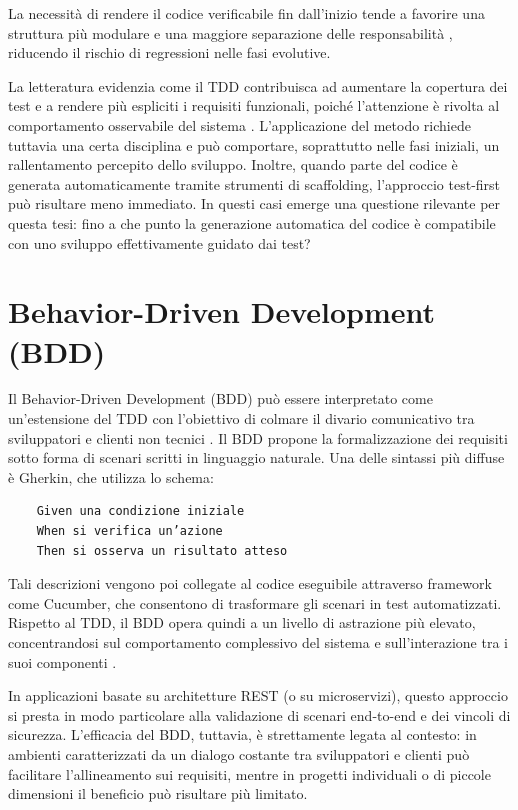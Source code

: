 La necessità di rendere il codice verificabile fin dall’inizio tende a favorire una struttura più modulare e una maggiore separazione delle responsabilità \cite{Meszaros2007}, riducendo il rischio di regressioni nelle fasi evolutive.

La letteratura evidenzia come il TDD contribuisca ad aumentare la copertura dei test e a rendere più espliciti i requisiti funzionali, poiché l’attenzione è rivolta al comportamento osservabile del sistema \cite{FarcicGarcia2015}. L’applicazione del metodo richiede tuttavia una certa disciplina e può comportare, soprattutto nelle fasi iniziali, un rallentamento percepito dello sviluppo. Inoltre, quando parte del codice è generata automaticamente tramite strumenti di scaffolding, l’approccio test-first può risultare meno immediato. In questi casi emerge una questione rilevante per questa tesi: fino a che punto la generazione automatica del codice è compatibile con uno sviluppo effettivamente guidato dai test?

\section{Behavior-Driven Development (BDD)}

Il Behavior-Driven Development (BDD) può essere interpretato come un’estensione del TDD con l’obiettivo di colmare il divario comunicativo tra sviluppatori e clienti non tecnici \cite{North2006}. Il BDD propone la formalizzazione dei requisiti sotto forma di scenari scritti in linguaggio naturale. Una delle sintassi più diffuse è Gherkin, che utilizza lo schema:

\begin{verbatim}
	Given una condizione iniziale
	When si verifica un’azione
	Then si osserva un risultato atteso
\end{verbatim}

Tali descrizioni vengono poi collegate al codice eseguibile attraverso framework come Cucumber, che consentono di trasformare gli scenari in test automatizzati. Rispetto al TDD, il BDD opera quindi a un livello di astrazione più elevato, concentrandosi sul comportamento complessivo del sistema e sull’interazione tra i suoi componenti \cite{Smart2014}.

In applicazioni basate su architetture REST (o su microservizi), questo approccio si presta in modo particolare alla validazione di scenari end-to-end e dei vincoli di sicurezza. L’efficacia del BDD, tuttavia, è strettamente legata al contesto: in ambienti caratterizzati da un dialogo costante tra sviluppatori e clienti può facilitare l’allineamento sui requisiti, mentre in progetti individuali o di piccole dimensioni il beneficio può risultare più limitato.

